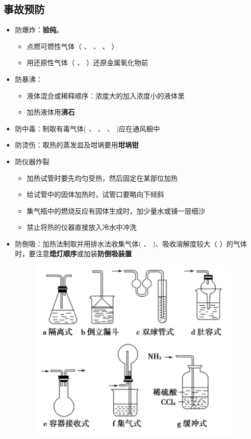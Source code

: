\documentclass[10pt]{article}
\begin{document}
	\subsection{事故预防}
	\begin{itemize}
		\item 防爆炸：\textbf{验纯}。
		\begin{itemize}
			\item 点燃可燃性气体（ 、 、 、 ）
			\item 用还原性气体（ 、 ）还原金属氧化物前
		\end{itemize}
		\item 防暴沸：
		\begin{itemize}
			\item 液体混合或稀释顺序：浓度大的加入浓度小的液体里
			\item 加热液体用\textbf{沸石}
		\end{itemize}
		\item 防中毒：制取有毒气体( 、 、 、 )应在通风橱中
		\item 防烫伤：取热的蒸发皿及坩埚要用\textbf{坩埚钳}
		\item 防仪器炸裂
		\begin{itemize}
			\item 加热试管时要先均匀受热，然后固定在某部位加热
			\item 给试管中的固体加热时，试管口要略向下倾斜
			\item 集气瓶中的燃烧反应有固体生成时，加少量水或铺一层细沙
			\item 禁止将热的仪器直接放入冷水中冲洗
		\end{itemize}
		\item 防倒吸：加热法制取并用排水法收集气体( 、 )、吸收溶解度较大（ ）的气体时，要注意\textbf{熄灯顺序}或加装\textbf{防倒吸装置}
		\begin{figure}[h]
		 \centering
		\includegraphics[scale=0.4]{res/Ammonia.pdf}

\end{figure}
\end{itemize}
\end{document}
